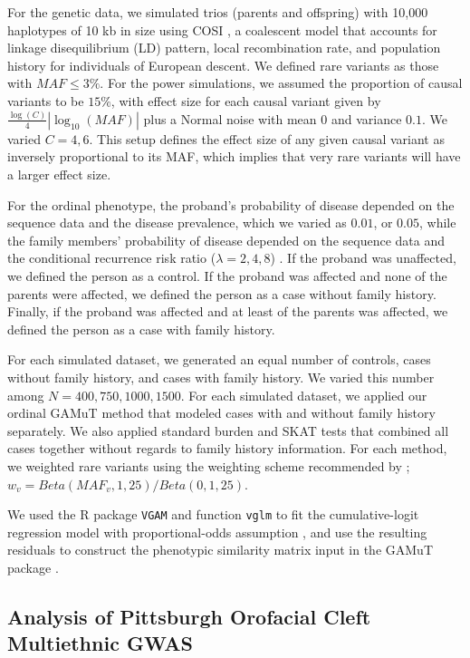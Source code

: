 \documentclass[]{article}
\begin{document}
For the genetic data, we simulated trios (parents and offspring) with
10,000 haplotypes of 10 kb in size using COSI \citep{cosi}, a coalescent
model that accounts for linkage disequilibrium (LD) pattern, local
recombination rate, and population history for individuals of European
descent. We defined rare variants as those with \(MAF \leq 3\%\). For
the power simulations, we assumed the proportion of causal variants to
be \(15\%\), with effect size for each causal variant given by
\(\frac{\log(C)}{4}|\log_{10}(MAF)|\) plus a Normal noise with mean
\(0\) and variance \(0.1\). We varied \(C=4,6\). This setup defines the
effect size of any given causal variant as inversely proportional to its
MAF, which implies that very rare variants will have a larger effect
size.

For the ordinal phenotype, the proband's probability of disease depended
on the sequence data and the disease prevalence, which we varied as
\(0.01\), or \(0.05\), while the family members' probability of disease
depended on the sequence data and the conditional recurrence risk ratio
(\(\lambda=2,4,8\)) \citep{Epstein2015}. If the proband was unaffected,
we defined the person as a control. If the proband was affected and none
of the parents were affected, we defined the person as a case without
family history. Finally, if the proband was affected and at least of the
parents was affected, we defined the person as a case with family
history.

For each simulated dataset, we generated an equal number of controls,
cases without family history, and cases with family history. We varied
this number among \(N=400, 750, 1000, 1500\). For each simulated
dataset, we applied our ordinal GAMuT method that modeled cases with and
without family history separately. We also applied standard burden and
SKAT tests that combined all cases together without regards to family
history information. For each method, we weighted rare variants using
the weighting scheme recommended by \citet{Wu2011};
\(w_v=Beta(MAF_v,1,25)/Beta(0,1,25)\).

We used the R package \texttt{VGAM} and function \texttt{vglm} to fit
the cumulative-logit regression model with proportional-odds assumption
\citep{Yee2010}, and use the resulting residuals to construct the
phenotypic similarity matrix input in the GAMuT package
\citep{Broadaway2016}.

\hypertarget{analysis-of-pittsburgh-orofacial-cleft-multiethnic-gwas}{%
\subsection{Analysis of Pittsburgh Orofacial Cleft Multiethnic
GWAS}\label{analysis-of-pittsburgh-orofacial-cleft-multiethnic-gwas}}
\end{document}
